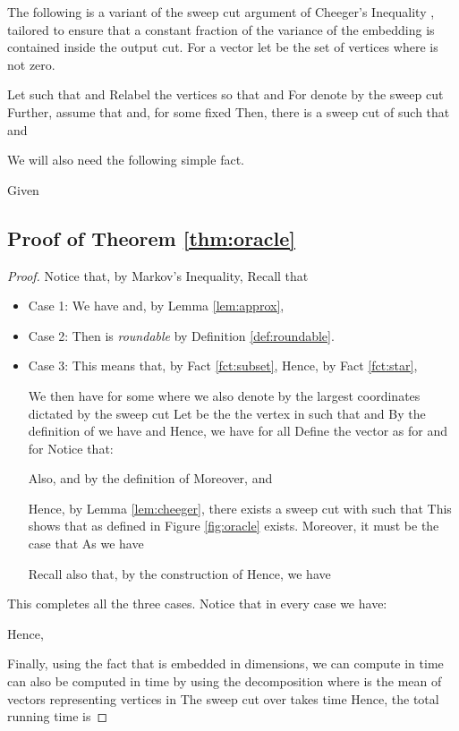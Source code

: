 \documentclass[twoside,leqno,twocolumn]{article}
\numberwithin{equation}{section}
\begin{document}
The following is a variant of the sweep cut argument of Cheeger's Inequality \cite{FAN}, tailored to ensure that a constant fraction of the variance of the embedding is contained inside the output cut.
For a vector  let  be the set of vertices where  is not zero. 
\begin{lemma} \label{lem:cheeger}
Let  such that   and  Relabel the vertices so that  and  For  denote by  the sweep cut  
Further, assume that  and, for some fixed  
Then, there is a sweep cut  of  such that  and 
\end{lemma}

\noindent
We will also need the following simple fact.
\begin{fact} \label{fct:triangle}
Given  
\end{fact}





\subsection{Proof of Theorem \ref{thm:oracle}}

\begin{proof}
Notice that, by Markov's Inequality,   Recall that 
\begin{itemize}
\item {\sc Case 1}:  We have  and, by Lemma \ref{lem:approx}, 

\item {\sc Case 2}:  Then  is {\it roundable} by Definition \ref{def:roundable}.

\item {\sc Case 3}:   This means that, by Fact \ref{fct:subset},  Hence, by Fact \ref{fct:star},


We then have  for some  where we also  denote by    the  largest coordinates dictated by the sweep cut  
Let  be the the vertex in  such that  and   
By the definition of  we have  and  Hence, we have  for all 
Define the vector  as  for  and  for  
Notice that:

Also,  and  by the definition of  Moreover,
 and

Hence, by Lemma \ref{lem:cheeger}, there exists a sweep cut  with  such that  This shows that  as defined in Figure \ref{fig:oracle} exists. Moreover, it must be the case that  As  we have

Recall also that, by the construction of  
Hence, we have 


\end{itemize}
This completes all the three cases.
Notice that in every case we have:

\noindent
Hence,


\noindent
Finally,  using the fact that  is embedded in  dimensions, we can compute  in time   can also be computed in time  by using the decomposition   where  is the mean of vectors representing vertices in  
The sweep cut over  takes time  Hence, the total running time is  
\end{proof}
\end{document}
